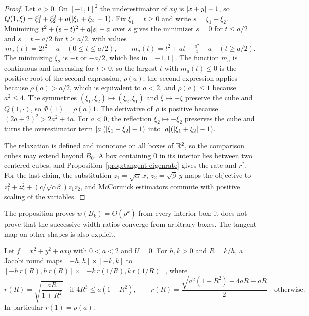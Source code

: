 \begin{proof}
Let $a>0$. On $[-1,1]^2$ the underestimator of $xy$ is $\lvert x+y\rvert-1$, so
$Q(1,\xi)=\xi_1^2+\xi_2^2+a(\lvert \xi_1+\xi_2\rvert-1)$. Fix $\xi_1=t\ge0$ and
write $s=\xi_1+\xi_2$. Minimizing $t^2+(s-t)^2+a\lvert s\rvert-a$ over $s$ gives the
minimizer $s=0$ for $t\le a/2$ and $s=t-a/2$ for $t\ge a/2$, with values
\[
  m_a(t)=2t^2-a\quad(0\le t\le a/2),\qquad
  m_a(t)=t^2+at-\tfrac{a^2}{4}-a\quad(t\ge a/2).
\]
The minimizing $\xi_2$ is $-t$ or $-a/2$, which lies in $[-1,1]$. The function
$m_a$ is continuous and increasing for $t>0$, so the largest $t$ with
$m_a(t)\le0$ is the positive root of the second expression, $\rho(a)$; the
second expression applies because $\rho(a)>a/2$, which is equivalent to
$a<2$, and $\rho(a)\le1$ because $a^2\le4$. The symmetries
$(\xi_1,\xi_2)\mapsto(\xi_2,\xi_1)$ and $\xi\mapsto-\xi$ preserve the cube and
$Q(1,\cdot)$, so $\Phi(1)=\rho(a)1$. The derivative of $\rho$ is positive
because $(2a+2)^2>2a^2+4a$. For $a<0$, the reflection
$\xi_2\mapsto-\xi_2$ preserves the cube and turns the overestimator
term $\lvert a\rvert(\lvert \xi_1-\xi_2\rvert-1)$ into $\lvert a\rvert(\lvert \xi_1+\xi_2\rvert-1)$.

The relaxation is defined and monotone on all boxes of $\mathbb{R}^2$, so the
comparison cubes may extend beyond $B_0$. A box containing $0$ in its
interior lies between two centered cubes, and
Proposition~\ref{prop:tangent-eigenrate} gives the rate and $r^*$. For the
last claim, the substitution $z_1=\sqrt\alpha\,x$, $z_2=\sqrt\beta\,y$ maps
the objective to $z_1^2+z_2^2+(c/\sqrt{\alpha\beta})z_1z_2$, and McCormick
estimators commute with positive scaling of the variables.
\end{proof}

The proposition proves $w(B_k)=\Theta(\rho^k)$ from every interior box; it
does not prove that the successive width ratios converge from arbitrary
boxes. The tangent map on other shapes is also explicit.

\begin{proposition}\label{prop:rectangle-map}
Let $f=x^2+y^2+axy$ with $0<a<2$ and $U=0$. For $h,k>0$ and $R=k/h$, a Jacobi
round maps $[-h,h]\times[-k,k]$ to
$[-h\,r(R),h\,r(R)]\times[-k\,r(1/R),k\,r(1/R)]$, where
\[
  r(R)=\sqrt{\frac{aR}{1+R^2}}\quad\text{if }4R^3\le a(1+R^2),\qquad
  r(R)=\frac{\sqrt{a^2(1+R^2)+4aR}-aR}{2}\quad\text{otherwise}.
\]
In particular $r(1)=\rho(a)$.
\end{proposition}

